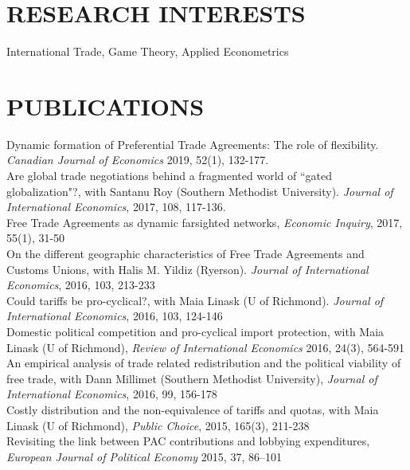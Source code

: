 \documentclass[11pt]{res}
\begin{document}
\begin{resume}
\section{RESEARCH INTERESTS}\vspace{1.5mm}
International Trade, Game Theory, Applied Econometrics

\section{PUBLICATIONS}\vspace{1.5mm}
{Dynamic formation of Preferential Trade Agreements: The role of flexibility}. \emph{Canadian Journal of Economics} 2019, 52(1), 132-177. \vspace{1.5mm}\\
{Are global trade negotiations behind a fragmented world of ``gated globalization"?}, with Santanu Roy (Southern Methodist University). \emph{Journal of International Economics}, 2017, 108, 117-136.\vspace{1.5mm}\\
{ Free Trade Agreements as dynamic farsighted networks}, \emph{Economic Inquiry}, 2017, 55(1), 31-50\vspace{1.5mm}\\
{On the different geographic characteristics of Free Trade Agreements and Customs Unions}, with Halis M. Yildiz (Ryerson). \emph{Journal of International Economics}, 2016, 103, 213-233 \vspace{1.5mm}\\


{Could tariffs be pro-cyclical?}, with Maia Linask (U of Richmond). \emph{Journal of International Economics}, 2016, 103, 124-146 \vspace{1.5mm}\\
{Domestic political competition and pro-cyclical import protection}, with Maia Linask (U of Richmond), \emph{Review of International Economics} 2016, 24(3), 564-591\vspace{1.5mm}\\
{An empirical analysis of trade related redistribution and the political viability of free trade}, with Dann Millimet (Southern Methodist University), \emph{Journal of International Economics}, 2016, 99, 156-178 \vspace{1.5mm}\\
{Costly distribution and the non-equivalence of tariffs and quotas}, with Maia Linask (U of Richmond), \emph{Public Choice}, 2015, 165(3), 211-238 \vspace{1.5mm}\\
{Revisiting the link between PAC contributions and lobbying expenditures, \emph{European Journal of Political Economy}} 2015, 37, 86--101


\end{resume}
\end{document}
